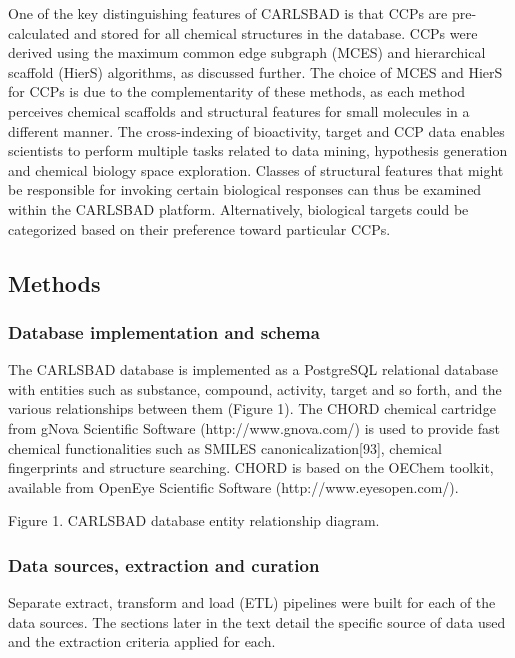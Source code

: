 One of the key distinguishing features of CARLSBAD is that CCPs are pre-calculated and stored for all chemical structures in the database. CCPs were derived using the maximum common edge subgraph (MCES) and hierarchical scaffold (HierS) algorithms, as discussed further. The choice of MCES and HierS for CCPs is due to the complementarity of these methods, as each method perceives chemical scaffolds and structural features for small molecules in a different manner. The cross-indexing of bioactivity, target and CCP data enables scientists to perform multiple tasks related to data mining, hypothesis generation and chemical biology space exploration. Classes of structural features that might be responsible for invoking certain biological responses can thus be examined within the CARLSBAD platform. Alternatively, biological targets could be categorized based on their preference toward particular CCPs.

\subsection{Methods}

\subsubsection{Database implementation and schema}

The CARLSBAD database is implemented as a PostgreSQL relational database with entities such as substance, compound, activity, target and so forth, and the various relationships between them (Figure 1). The CHORD chemical cartridge from gNova Scientific Software (http://www.gnova.com/) is used to provide fast chemical functionalities such as SMILES canonicalization[93], chemical fingerprints and structure searching. CHORD is based on the OEChem toolkit, available from OpenEye Scientific Software (http://www.eyesopen.com/).

Figure 1.
CARLSBAD database entity relationship diagram.

\subsubsection{Data sources, extraction and curation}

Separate extract, transform and load (ETL) pipelines were built for each of the data sources. The sections later in the text detail the specific source of data used and the extraction criteria applied for each.

